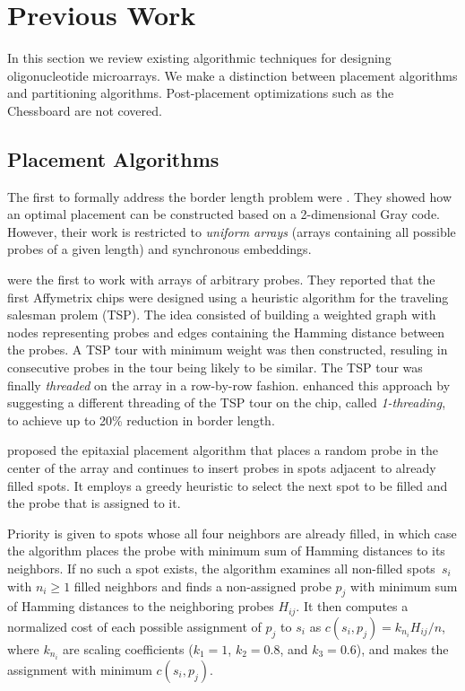 \documentclass{bioinfo}
\begin{document}
\section{Previous Work}

In this section we review existing algorithmic techniques for designing oligonucleotide microarrays. We make a distinction between placement algorithms and partitioning algorithms. Post-placement optimizations such as the Chessboard \citep{KAHNG02} are not covered.

\subsection{Placement Algorithms}

The first to formally address the border length problem were \citealp{FELDMAN93}. They showed how an optimal placement can be constructed based on a 2-dimensional Gray code. However, their work is restricted to \emph{uniform arrays} (arrays containing all possible probes of a given length) and synchronous embeddings.

\citealp{HANNENHALLI02} were the first to work with arrays of arbitrary probes. They reported that the first Affymetrix chips were designed using a heuristic algorithm for the traveling salesman prolem (TSP). The idea consisted of building a weighted graph with nodes representing probes and edges containing the Hamming distance between the probes. A TSP tour with minimum weight was then constructed, resuling in consecutive probes in the tour being likely to be similar. The TSP tour was finally \emph{threaded} on the array in a row-by-row fashion. \citealp{HANNENHALLI02} enhanced this approach by suggesting a different threading of the TSP tour on the chip, called \emph{1-threading}, to achieve up to 20\% reduction in border length.

\citealp{KAHNG02} proposed the epitaxial placement algorithm that places a random probe in the center of the array and continues to insert probes in spots adjacent to already filled spots. It employs a greedy heuristic to select the next spot to be filled and the probe that is assigned to it.

Priority is given to spots whose all four neighbors are already filled, in which case the algorithm places the probe with minimum sum of Hamming distances to its neighbors. If no such a spot exists, the algorithm examines all non-filled spots~$s_i$ with $n_i \geq 1$ filled neighbors and finds a non-assigned probe $p_j$ with minimum sum of Hamming distances to the neighboring probes $H_{ij}$. It then computes a normalized cost of each possible assignment of $p_j$ to $s_i$ as $c(s_i,p_j) = k_{n_i} H_{ij} / n$, where $k_{n_i}$ are scaling coefficients ($k_1 = 1$, $k_2 = 0.8$, and $k_3 = 0.6$), and makes the assignment with minimum $c(s_i,p_j)$.
\end{document}
